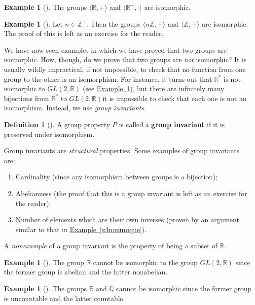 \documentclass[10pt,]{book}
\newcommand{\terminology}[1]{\textbf{#1}}
\theoremstyle{plain}
\theoremstyle{definition}
\newtheorem{definition}[theorem]{Definition}
\theoremstyle{definition}
\theoremstyle{definition}
\newtheorem{example}[theorem]{Example}
\theoremstyle{definition}
\numberwithin{equation}{section}
\def\Z{\mathbb{Z}}
\def\R{\mathbb{R}}
\def\Q{\mathbb{Q}}
\begin{document}
\begin{example}[]\label{example-27}
The groups \(\langle \R,+\rangle\) and \(\langle \R^+, \cdot\rangle\) are isomorphic.%
\end{example}
\begin{example}[]\label{example-28}
Let \(n\in \Z^+\). Then the groups \(\langle n\Z,+\rangle\) and \(\langle \Z,+\rangle\) are isomorphic. The proof of this is left as an exercise for the reader.%
\end{example}
We have now seen examples in which we have proved that two groups are isomorphic. How, though, do we prove that two groups are \emph{not} isomorphic? It is usually wildly impractical, if not impossible, to check that no function from one group to the other is an isomorphism. For instance, it turns out that \(\R^*\) is not isomorphic to \(GL(2,\R)\) (see \hyperref[rgl]{Example~\ref{rgl}}), but there are infinitely many bijections from \(\R^*\) to \(GL(2,\R)\)\textemdash{}it is impossible to check that each one is not an isomorphism. Instead, we use \emph{group invariants}.%
\begin{definition}[{}]\label{definition-34}
A group property \(P\) is called a \terminology{group invariant} if it is preserved under isomorphism.%
\end{definition}
Group invariants are \emph{structural} properties. Some examples of group invariants are: \leavevmode%
\begin{enumerate}
\item\hypertarget{li-145}{}Cardinality (since any isomorphism between groups is a bijection);%
\item\hypertarget{li-146}{}Abelianness (the proof that this is a group invariant is left as an exercise for the reader);%
\item\hypertarget{li-147}{}Number of elements which are their own inverses (proven by an argument similar to that in \hyperref[x4nonunique]{Example~\ref{x4nonunique}}).%
\end{enumerate}
%
\par
A \emph{nonexample} of a group invariant is the property of being a subset of \(\R\).%
\begin{example}[]\label{rgl}
The group \(\R\) cannot be isomorphic to the group \(GL(2,\R)\) since the former group is abelian and the latter nonabelian.%
\end{example}
\begin{example}[]\label{example-30}
The groups \(\R\) and \(\Q\) cannot be isomorphic since the former group is uncountable and the latter countable.%
\end{example}
\end{document}
